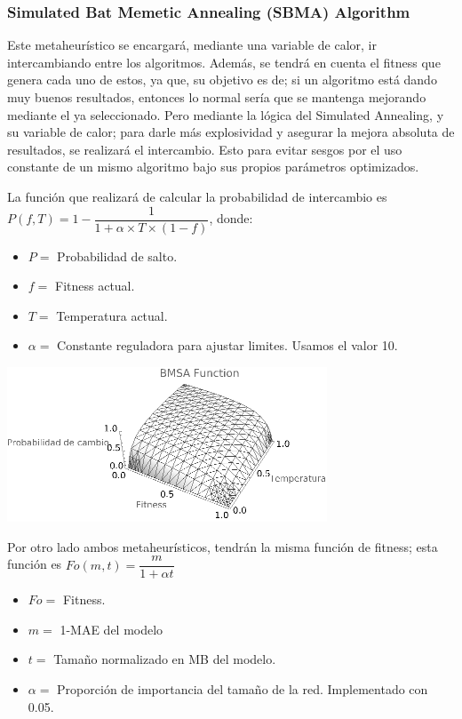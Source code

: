 \subsubsection{Simulated Bat Memetic Annealing (SBMA) Algorithm}
Este metaheurístico se encargará, mediante una variable de calor, ir intercambiando entre los algoritmos. Además, se tendrá en cuenta el fitness que genera cada uno de estos, ya que, su objetivo es de; si un algoritmo está dando muy buenos resultados, entonces lo normal sería que se mantenga mejorando mediante el ya seleccionado. Pero mediante la lógica del Simulated Annealing, y su variable de calor; para darle más explosividad y asegurar la mejora absoluta de resultados, se realizará el intercambio. Esto para evitar sesgos por el uso constante de un mismo algoritmo bajo sus propios parámetros optimizados.\newline

La función que realizará de calcular la probabilidad de intercambio es
$P(f,T) = 1 - \dfrac{1}{1+\alpha\times T\times(1-f)}$, donde:

\begin{itemize}
    \item $P =$ Probabilidad de salto.
    \item $f =$ Fitness actual.
    \item $T =$ Temperatura actual.
    \item $\alpha =$ Constante reguladora para ajustar limites. Usamos el valor 10.
\end{itemize}

\begin{center}
    \includegraphics[scale=0.4]{Imagenes/BMSA.png}
\end{center}

Por otro lado ambos metaheurísticos, tendrán la misma función de fitness; esta función es $Fo(m,t)=\dfrac{m}{1+\alpha t}$

\begin{itemize}
    \item $Fo =$ Fitness.
    \item $m =$ 1-MAE del modelo
    \item $t =$ Tamaño normalizado en MB del modelo.
    \item $\alpha =$  Proporción de importancia del tamaño de la red. Implementado con 0.05.
\end{itemize}

